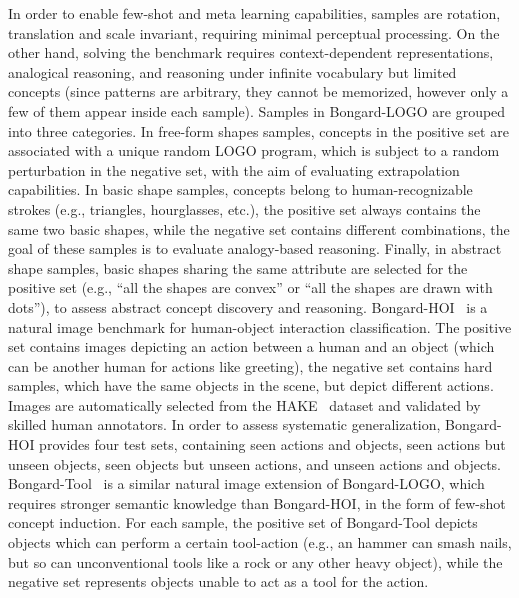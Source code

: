 In order to enable few-shot and meta learning capabilities, samples are rotation, translation and scale invariant, requiring minimal perceptual processing. On the other hand, solving the benchmark requires context-dependent representations, analogical reasoning, and reasoning under infinite vocabulary but limited concepts (since patterns are arbitrary, they cannot be memorized, however only a few of them appear inside each sample).
Samples in Bongard-LOGO are grouped into three categories.
In free-form shapes samples, concepts in the positive set are associated with a unique random LOGO program, which is subject to a random perturbation in the negative set, with the aim of evaluating extrapolation capabilities.
In basic shape samples, concepts belong to human-recognizable strokes (e.g., triangles, hourglasses, etc.), the positive set always contains the same two basic shapes, while the negative set contains different combinations, the goal of these samples is to evaluate analogy-based reasoning.
Finally, in abstract shape samples, basic shapes sharing the same attribute are selected for the positive set (e.g., ``all the shapes are convex'' or ``all the shapes are drawn with dots''), to assess abstract concept discovery and reasoning.
Bongard-HOI~\cite{jiang2022bongard} is a natural image benchmark for human-object interaction classification. %
The positive set contains images depicting an action between a human and an object (which can be another human for actions like greeting), the negative set contains hard samples, which have the same objects in the scene, but depict different actions.
Images are automatically selected from the HAKE~\cite{li2019hake} dataset and validated by skilled human annotators.
In order to assess systematic generalization, Bongard-HOI provides four test sets, containing seen actions and objects, seen actions but unseen objects, seen objects but unseen actions, and unseen actions and objects.
Bongard-Tool~\cite{jiang2023bongard} is a similar natural image extension of Bongard-LOGO, which requires stronger semantic knowledge than Bongard-HOI, in the form of few-shot concept induction.
For each sample, the positive set of Bongard-Tool depicts objects which can perform a certain tool-action (e.g., an hammer can smash nails, but so can unconventional tools like a rock or any other heavy object), while the negative set represents objects unable to act as a tool for the action.
